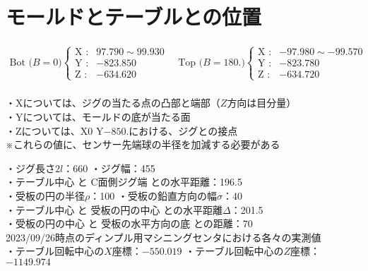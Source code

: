 \chapter{モールドとテーブルとの位置}
\begin{tcolorbox}[title={2023/07/28時点の三菱マシニングセンタ実測値}, fonttitle=\gtfamily\bfseries]
\begin{align*}
  \text{Bot ($B=0$)}
  \left\{
  \begin{array}{rl}
    \text{X :} & 97.790 \sim 99.930\\
    \text{Y :} & -823.850\\
    \text{Z :} & -634.620
  \end{array}
  \right.\quad
  \text{Top ($B=180.$)}
  \left\{
  \begin{array}{rl}
    \text{X :} & -97.980 \sim -99.570\\
    \text{Y :} & -823.780\\
    \text{Z :} & -634.720
  \end{array}
  \right.
\end{align*}\\
・Xについては、ジグの当たる点の凸部と端部（$Z$方向は目分量）\\
・Yについては、モールドの底が当たる面\\
・Zについては、X0 Y$-850.$における、ジグとの接点\\
※これらの値に、センサー先端球の半径を加減する必要がある
\end{tcolorbox}
\begin{tcolorbox}[title={ディンプル用マシニングセンタにおける各々の値（図面上の値）}, fonttitle=\gtfamily\bfseries]
・ジグ長さ$2l$：660 \quad ・ジグ幅：455\\
・テーブル中心 と C面側ジグ端 との水平距離：196.5\\
・受板の円の半径$\rho$：100 \quad ・受板の鉛直方向の幅$\sigma$：40\\
・テーブル中心 と 受板の円の中心 との水平距離$\varDelta$：201.5\\
・受板の円の中心 と 受板の水平方向の底 との距離：70\\[12pt]
2023/09/26時点のディンプル用マシニングセンタにおける各々の実測値\\
・テーブル回転中心の$X$座標：$-550.019$ \quad ・テーブル回転中心の$Z$座標：$-1149.974$
\end{tcolorbox}




